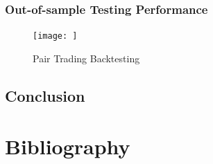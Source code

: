 \documentclass[11pt,a4paper]{article}
\begin{document}
    \subsubsection{Out-of-sample Testing Performance}
    \begin{figure}[H]
        \centering
        \texttt{[image: ]}
        \caption{Pair Trading Backtesting}
        \label{fig:crypto_backtest}
    \end{figure}
    
    \subsection{Conclusion}
    
    \newpage
    \section{Bibliography}
    
    
\end{document}
